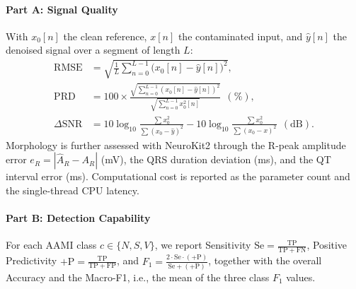 \paragraph*{Part A: Signal Quality}
With $x_0[n]$ the clean reference, $x[n]$ the contaminated input, and $\hat{y}[n]$ the denoised signal over a segment of length $L$:
\begin{align}
\mathrm{RMSE} &= \sqrt{\frac{1}{L} \sum_{n=0}^{L-1} \big(x_0[n] - \hat{y}[n]\big)^2}, \\
\mathrm{PRD}  &= 100 \times \frac{\sqrt{\sum_{n=0}^{L-1} (x_0[n] - \hat{y}[n])^2}}{\sqrt{\sum_{n=0}^{L-1} x_0^2[n]}}\ \ (\%), \\
\Delta\mathrm{SNR} &= 10\log_{10}\frac{\sum x_0^2}{\sum (x_0 - \hat{y})^2} - 10\log_{10}\frac{\sum x_0^2}{\sum (x_0 - x)^2}\ \ (\mathrm{dB}).
\end{align}
Morphology is further assessed with NeuroKit2 \cite{makowski2021} through the R-peak amplitude error $e_R = |\hat{A}_R - A_R|$ (mV), the QRS duration deviation (ms), and the QT interval error (ms). Computational cost is reported as the parameter count and the single-thread CPU latency.

\paragraph*{Part B: Detection Capability}
For each AAMI class $c \in \{N, S, V\}$, we report Sensitivity $\mathrm{Se} = \frac{\mathrm{TP}}{\mathrm{TP} + \mathrm{FN}}$, Positive Predictivity $+\mathrm{P} = \frac{\mathrm{TP}}{\mathrm{TP} + \mathrm{FP}}$, and $F_1 = \frac{2 \cdot \mathrm{Se} \cdot (+\mathrm{P})}{\mathrm{Se} + (+\mathrm{P})}$, together with the overall Accuracy and the Macro-F1, i.e., the mean of the three class $F_1$ values.
